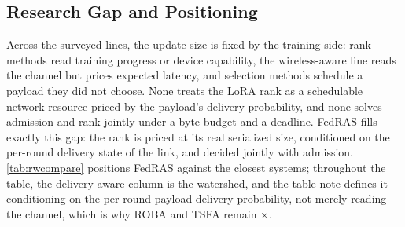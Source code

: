 \documentclass[a4paper,fleqn]{cas-dc}
\begin{document}
\subsection{Research Gap and Positioning}
Across the surveyed lines, the update size is fixed by the training side: rank methods read training progress or device capability, the wireless-aware line reads the channel but prices expected latency, and selection methods schedule a payload they did not choose. None treats the LoRA rank as a schedulable network resource priced by the payload's delivery probability, and none solves admission and rank jointly under a byte budget and a deadline. FedRAS fills exactly this gap: the rank is priced at its real serialized size, conditioned on the per-round delivery state of the link, and decided jointly with admission. \cref{tab:rwcompare} positions FedRAS against the closest systems; throughout the table, the delivery-aware column is the watershed, and the table note defines it---conditioning on the per-round payload delivery probability, not merely reading the channel, which is why ROBA and TSFA remain $\times$.
\par
\par
\end{document}
